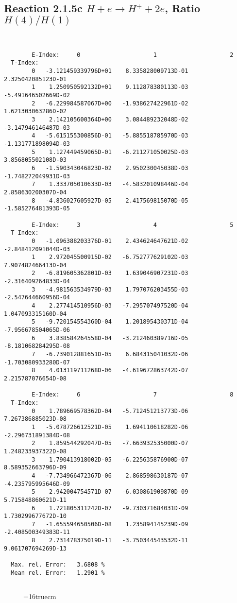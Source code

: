 \documentclass[12pt,dvipdfmx]{article}
\begin{document}
\newpage
\subsection{
Reaction 2.1.5c  $H + e \rightarrow H^+ + 2e$, Ratio $H(4)/H(1)$
}


\begin{small}\begin{verbatim}


        E-Index:     0                     1                     2
  T-Index:
        0   -3.121459339796D+01    8.335828009713D-01    2.325042085123D-01
        1    1.250950592132D+01    9.112878380113D-03   -5.491646502669D-02
        2   -6.229984587067D+00   -1.938627422961D-02    1.621303063286D-02
        3    2.142105600364D+00    3.084489232048D-02   -3.147946146487D-03
        4   -5.615155300856D-01   -5.885518785970D-03   -1.131771898094D-03
        5    1.127449459065D-01   -6.211271050025D-03    3.856805502108D-03
        6   -1.590343046823D-02    2.950230045038D-03   -1.748272049931D-03
        7    1.333705010633D-03   -4.583201098446D-04    2.858630200307D-04
        8   -4.836027605927D-05    2.417569815070D-05   -1.585276481393D-05

        E-Index:     3                     4                     5
  T-Index:
        0   -1.096388203376D-01    2.434624647621D-02   -2.848412091044D-03
        1    2.972045500915D-02   -6.752777629102D-03    7.907482466413D-04
        2   -6.819605362801D-03    1.639046907231D-03   -2.316409264833D-04
        3   -4.981563534979D-03    1.797076203455D-03   -2.547644660956D-04
        4    2.277414510956D-03   -7.295707497520D-04    1.047093315160D-04
        5   -9.720154554360D-04    1.201895430371D-04   -7.956678504065D-06
        6    3.838584264558D-04   -3.212460389716D-05   -8.181068284295D-08
        7   -6.739012881651D-05    6.684315041032D-06   -1.703080933280D-07
        8    4.013119711268D-06   -4.619672863742D-07    2.215787076654D-08

        E-Index:     6                     7                     8
  T-Index:
        0    1.789669578362D-04   -5.712451213773D-06    7.267386885023D-08
        1   -5.078726612521D-05    1.694110618282D-06   -2.296731891384D-08
        2    1.859544292047D-05   -7.663932535000D-07    1.248233937322D-08
        3    1.790413918002D-05   -6.225635876900D-07    8.589352663796D-09
        4   -7.734966472367D-06    2.868598630187D-07   -4.235795995646D-09
        5    2.942004754571D-07   -6.030861909870D-09    5.715848860621D-11
        6    1.721805311242D-07   -9.730371684031D-09    1.730299677672D-10
        7   -1.655594650506D-08    1.235894145239D-09   -2.408500349383D-11
        8    2.731478375019D-11   -3.750344543532D-11    9.061707694269D-13

  Max. rel. Error:   3.6808 %
  Mean rel. Error:   1.2901 %


\end{verbatim}\end{small}
\begin{figure} \label{2.1.5c}
\epsfxsize=16truecm
\end{figure}
\end{document}
